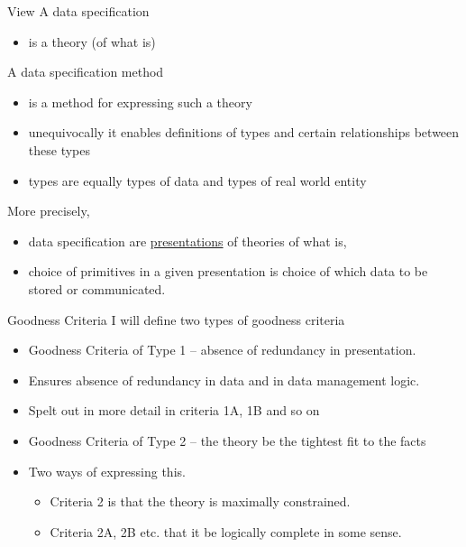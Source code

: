 \begin{frame}{View}
A data specification  
\begin{itemize}
\item is a  theory (of what is)
\end{itemize}
\medskip
A data specification method 
\begin{itemize}
\item is a method for expressing such a  theory
\item unequivocally it enables definitions of types and certain relationships between these types
\item types are equally types of data and types of real world entity
\end{itemize}
More precisely, 
\begin{itemize}
\item data specification are \underline{presentations} of theories of what is,
\item choice of primitives in a given presentation is choice of which data to be stored or communicated.
\end{itemize}
\end{frame}



\begin{frame}{Goodness Criteria}
I will define two types of goodness criteria
\begin{itemize}
    \item Goodness Criteria of Type 1 -- absence of redundancy in presentation.
    \item Ensures absence of redundancy in data and in data management logic.
    \item Spelt out in more detail in criteria 1A, 1B and so on
    \item  Goodness Criteria of Type 2 -- the theory be the tightest fit to the facts 
    \item Two ways of expressing this. 
    \begin{itemize}
        \item Criteria 2 is that the theory is maximally constrained.
        \item Criteria 2A, 2B etc.  that it be logically complete in some sense.
    \end{itemize}
\end{itemize}
\end{frame}


